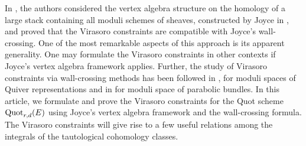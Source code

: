 \documentclass[11pt]{amsart}
\theoremstyle{remark}
\newcommand{\quot}[0]{\textnormal{Quot}}
\numberwithin{theorem}{section}
\begin{document}
    In \cite{BLM24}, the authors considered the vertex algebra structure on the homology of a large stack containing all moduli schemes of sheaves, constructed by Joyce in \cite{Joy19},
    and proved that the Virasoro constraints are compatible with Joyce's wall-crossing.
    One of the most remarkable aspects of this approach is its apparent generality.
    One may formulate the Virasoro constraints in other contexts if Joyce’s vertex algebra framework applies.
    Further, the study of Virasoro constraints via wall-crossing methods has been followed in \cite{Boj24}, \cite{LM24} for moduli spaces of Quiver representations and in \cite{Mor25} for moduli space of parabolic bundles.
    In this article, we formulate and prove the Virasoro constraints for the Quot scheme $\quot_{r,d}(E)$ using Joyce's vertex algebra framework and the wall-crossing formula.
    The Virasoro constraints will give rise to a few useful relations among the integrals of the tautological cohomology classes.
    
\end{document}
